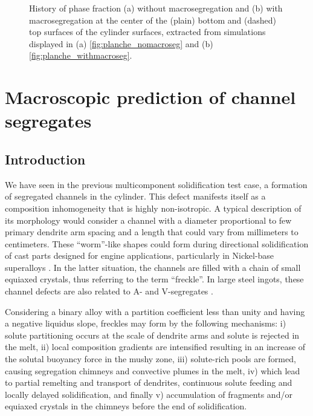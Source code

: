 \begin{figure}[htbp]
\begin{subfigure}[t]{0.6\textwidth}
	\caption{}
    \label{fig:tp_withmacroseg}
  \end{subfigure}
\caption{History of phase fraction (a) without macrosegregation and (b) with 
macrosegregation at the center of the (plain) bottom and (dashed) top surfaces 
of the cylinder surfaces, extracted from simulations displayed in (a) \cref{fig:planche_nomacroseg}
and (b) \cref{fig:planche_withmacroseg}.} 
\label{fig:tp_macroseg_influence}
\end{figure}
%
\section{Macroscopic prediction of channel segregates}
\subsection{Introduction}
\label{sec:intro_freckle}
We have seen in the previous multicomponent solidification test case, a formation of segregated channels in the cylinder. 
This defect manifests itself as a composition inhomogeneity that is highly non-isotropic. A typical description of its 
morphology would consider a channel with a diameter proportional to few primary dendrite arm spacing and a length that 
could vary from millimeters to centimeters. These “worm”-like shapes could form during directional solidification of cast 
parts designed for engine applications, particularly in Nickel-base superalloys \citep{giamei_nature_1970,beckermann_development_2000,
genereux_characterization_2000,schneider_modeling_1997}. In the latter situation, the channels are filled with a chain of small equiaxed 
crystals, thus referring to the term “freckle”. In large steel ingots, these channel defects are also related to A- and V-segregates   
\citep{pickering_macrosegregation_2013}. 

Considering a binary alloy with a partition coefficient less than unity and having a negative liquidus slope, 
freckles may form by the following mechanisms: i) solute partitioning occurs at the scale of dendrite arms and 
solute is rejected in the melt, ii) local composition gradients are intensified resulting in an increase of the 
solutal buoyancy force in the mushy zone, iii) solute-rich pools are formed, causing segregation chimneys and convective plumes in the melt, 
iv) which lead to partial remelting and transport of dendrites, continuous solute feeding and locally delayed solidification,
and finally v) accumulation of fragments and/or equiaxed crystals in the chimneys before the end of solidification.

